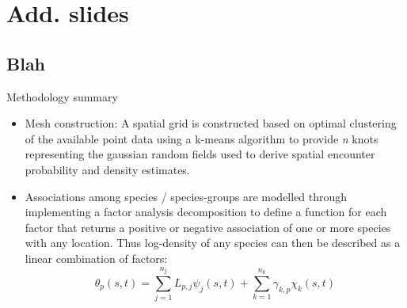 \documentclass[xcolor=x11names,compress]{beamer}
\renewcommand{\(}{\begin{columns}}
\renewcommand{\)}{\end{columns}}
\newcommand{\<}[1]{\begin{column}{#1}}
\renewcommand{\>}{\end{column}}
\begin{document}
\begin{frame}{} 


\end{frame}



\appendix
\section{Add. slides}
\subsection{Blah}
\begin{frame}{Methodology summary}

\begin{itemize}
	\small
	\setlength\itemsep{2em}

	\item Mesh construction: A spatial grid is constructed based on optimal
		clustering of the available point data using a k-means
		algorithm to provide \textit{n} knots representing the gaussian
		random fields used to derive spatial encounter probability and
		density estimates.

	\item  Associations among species / species-groups are modelled through
		implementing a factor analysis decomposition to define a
		function for each factor that returns a positive or negative
		association of one or more species with any location. Thus
		log-density of any species can then be described as a linear
		combination of factors:
		\begin{equation}
			\theta_{p}(s,t) = \sum_{j=1}^{n_{j}}
			L_{p,j}\psi_{j}(s,t) +\sum_{k=1}^{n_{k}}
			\gamma_{k,p}\chi_{k}(s,t)
		\end{equation}
	
\end{itemize}

\end{frame}
\end{document}
